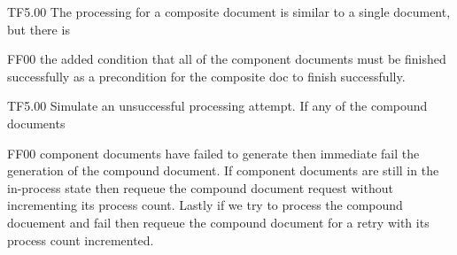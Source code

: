 \@pvspace{8.0pt}%
\begin{lcom}{2.5}%
\begin{cpar}{0}{T}{F}{5.0}{0}{}%
 The processing for a composite document is similar to a single document, but
 there is
\end{cpar}%
\begin{cpar}{1}{F}{F}{0}{0}{}%
 the added condition that all of the component documents must be finished
 successfully
 as a precondition for the composite doc to finish successfully.
\end{cpar}%
\end{lcom}%
%
%
%
%
%
%
%
%
%
\@pvspace{8.0pt}%
\@x{}%
%
\@xx{}%
%
%
%
%
%
%
\@pvspace{8.0pt}%
\begin{lcom}{2.5}%
\begin{cpar}{0}{T}{F}{5.0}{0}{}%
Simulate an unsuccessful processing attempt. If any of the compound documents
\end{cpar}%
\begin{cpar}{1}{F}{F}{0}{0}{}%
 component documents have failed to generate then immediate fail the
 generation of the
 compound document. If component documents are still in the in-process state
 then requeue
 the compound document request without incrementing its process count. Lastly
 if we try
 to process the compound docuement and fail then requeue the compound
 document for a retry
 with its process count incremented.
\end{cpar}%
\end{lcom}%
%
